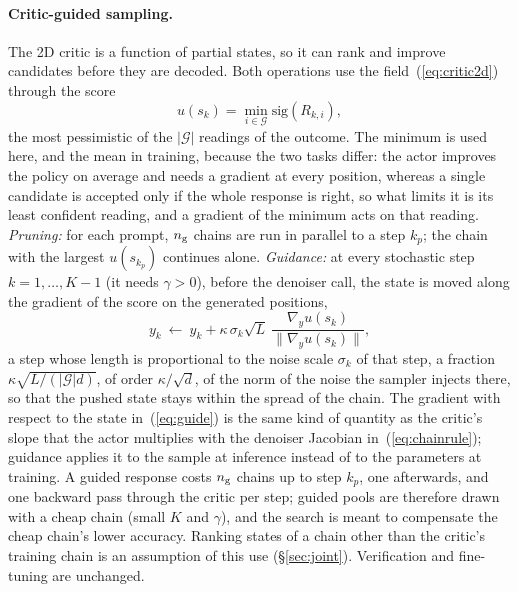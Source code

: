 \paragraph{Critic-guided sampling.}
The 2D critic is a function of partial states, so it can rank and improve candidates before they are decoded. Both operations use the field~(\ref{eq:critic2d}) through the score
\begin{equation}
u(s_k)=\min_{i\in\mathcal G}\mathrm{sig}(R_{k,i}),
\label{eq:minscore}
\end{equation}
the most pessimistic of the $|\mathcal G|$ readings of the outcome. The minimum is used here, and the mean in training, because the two tasks differ: the actor improves the policy on average and needs a gradient at every position, whereas a single candidate is accepted only if the whole response is right, so what limits it is its least confident reading, and a gradient of the minimum acts on that reading. \emph{Pruning:} for each prompt, $n_{\rm g}$ chains are run in parallel to a step $k_p$; the chain with the largest $u(s_{k_p})$ continues alone. \emph{Guidance:} at every stochastic step $k=1,\dots,K-1$ (it needs $\gamma>0$), before the denoiser call, the state is moved along the gradient of the score on the generated positions,
\begin{equation}
y_k\ \leftarrow\ y_k+\kappa\,\sigma_k\sqrt L\ \frac{\nabla_{y}u(s_k)}{\|\nabla_{y}u(s_k)\|},
\label{eq:guide}
\end{equation}
a step whose length is proportional to the noise scale $\sigma_k$ of that step, a fraction $\kappa\sqrt{L/(|\mathcal G|d)}$, of order $\kappa/\sqrt d$, of the norm of the noise the sampler injects there, so that the pushed state stays within the spread of the chain. The gradient with respect to the state in~(\ref{eq:guide}) is the same kind of quantity as the critic's slope that the actor multiplies with the denoiser Jacobian in~(\ref{eq:chainrule}); guidance applies it to the sample at inference instead of to the parameters at training. A guided response costs $n_{\rm g}$ chains up to step $k_p$, one afterwards, and one backward pass through the critic per step; guided pools are therefore drawn with a cheap chain (small $K$ and $\gamma$), and the search is meant to compensate the cheap chain's lower accuracy. Ranking states of a chain other than the critic's training chain is an assumption of this use (\S\ref{sec:joint}). Verification and fine-tuning are unchanged.

